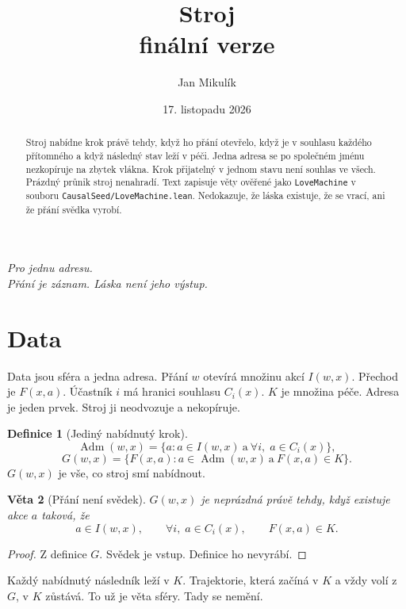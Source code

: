 \documentclass[11pt,a4paper]{article}
\title{\textbf{Stroj}\\[4pt]
\large finální verze}
\author{Jan Mikulík}
\date{17. listopadu 2026}
\newtheorem{theorem}{Věta}
\theoremstyle{definition}
\newtheorem{definition}[theorem]{Definice}
\theoremstyle{remark}
\newcommand{\Adm}{\operatorname{Adm}}
\begin{document}
\maketitle

\begin{center}
\itshape
Pro jednu adresu.\\
Přání je záznam. Láska není jeho výstup.
\end{center}

\begin{abstract}
Stroj nabídne krok právě tehdy, když ho přání otevřelo, když je v souhlasu každého přítomného a když následný stav leží v péči.
Jedna adresa se po společném jménu nezkopíruje na zbytek vlákna.
Krok přijatelný v jednom stavu není souhlas ve všech.
Prázdný průnik stroj nenahradí.
Text zapisuje věty ověřené jako \texttt{LoveMachine} v souboru \texttt{CausalSeed/LoveMachine.lean}.
Nedokazuje, že láska existuje, že se vrací, ani že přání svědka vyrobí.
\end{abstract}

\section{Data}

Data jsou sféra a jedna adresa.
Přání \(w\) otevírá množinu akcí \(I(w,x)\).
Přechod je \(F(x,a)\).
Účastník \(i\) má hranici souhlasu \(C_i(x)\).
\(K\) je množina péče.
Adresa je jeden prvek. Stroj ji neodvozuje a nekopíruje.

\begin{definition}[Jediný nabídnutý krok]
\[
  \Adm(w,x)
  =
  \bigl\{a :
    a\in I(w,x)
    \ \text{a}\ 
    \forall i,\; a\in C_i(x)
  \bigr\},
\]
\[
  G(w,x)
  =
  \bigl\{F(x,a): a\in\Adm(w,x)\ \text{a}\ F(x,a)\in K\bigr\}.
\]
\(G(w,x)\) je vše, co stroj smí nabídnout.
\end{definition}

\begin{theorem}[Přání není svědek]
\(G(w,x)\) je neprázdná právě tehdy, když existuje akce \(a\) taková, že
\[
  a\in I(w,x),
  \qquad
  \forall i,\; a\in C_i(x),
  \qquad
  F(x,a)\in K.
\]
\end{theorem}

\begin{proof}
Z definice \(G\). Svědek je vstup. Definice ho nevyrábí.
\end{proof}

Každý nabídnutý následník leží v \(K\).
Trajektorie, která začíná v \(K\) a vždy volí z \(G\), v \(K\) zůstává.
To už je věta sféry. Tady se nemění.
\end{document}
